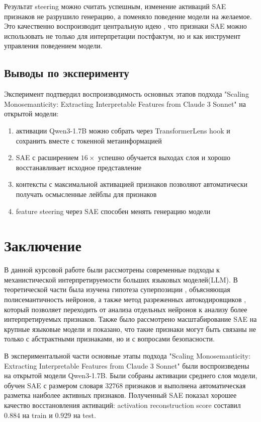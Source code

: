\documentclass[a4paper,14pt]{extreport}
\begin{document}
Результат steering можно считать успешным, изменение
активаций SAE признаков не разрушило генерацию, а поменяло поведение модели на желаемое. 
Это качественно воспроизводит центральную
идею \cite{templeton2024scaling}, что признаки SAE можно использовать не только
для интерпретации постфактум, но и как инструмент управления поведением модели.


\section{Выводы по эксперименту}

Эксперимент подтвердил воспроизводимость основных этапов подхода
"Scaling Monosemanticity: Extracting Interpretable Features from Claude 3 Sonnet" 
\cite{templeton2024scaling} на открытой модели:
\begin{enumerate}
    \item активации Qwen3-1.7B можно собрать через TransformerLens hook
          и сохранить вместе с токенной метаинформацией
    \item SAE с расширением $16\times$ успешно обучается выходах слоя и хорошо восстанавливает исходное представление
    \item контексты с максимальной активацией признаков позволяют автоматически получать осмысленные
          лейблы для признаков
    \item feature steering через SAE способен менять генерацию модели
\end{enumerate}


\chapter*{Заключение}

В данной курсовой работе были рассмотрены современные подходы к механистической
интерпретируемости больших языковых моделей(LLM). В теоретической части была изучена
гипотеза суперпозиции \cite{elhage2022superposition}, объясняющая
полисемантичность нейронов, а также метод разреженных автокодировщиков
\cite{bricken2023monosemanticity}, который позволяет переходить от анализа
отдельных нейронов к анализу более интерпретируемых признаков. Также было
рассмотрено масштабирование SAE на крупные языковые модели
\cite{templeton2024scaling} и показано, что такие признаки могут быть связаны
не только с абстрактными признаками, но и с вопросами безопасности.

В экспериментальной части основные этапы подхода "Scaling Monosemanticity: Extracting Interpretable Features from Claude 3 Sonnet" 
были воспроизведены на открытой модели Qwen3-1.7B. Были собраны активации среднего
слоя модели, обучен SAE с размером словаря $32768$ признаков и выполнена
автоматическая разметка наиболее активных признаков. Полученный SAE показал
хорошее качество восстановления активаций: activation reconstruction score
составил $0.884$ на train и $0.929$ на test.
\end{document}
